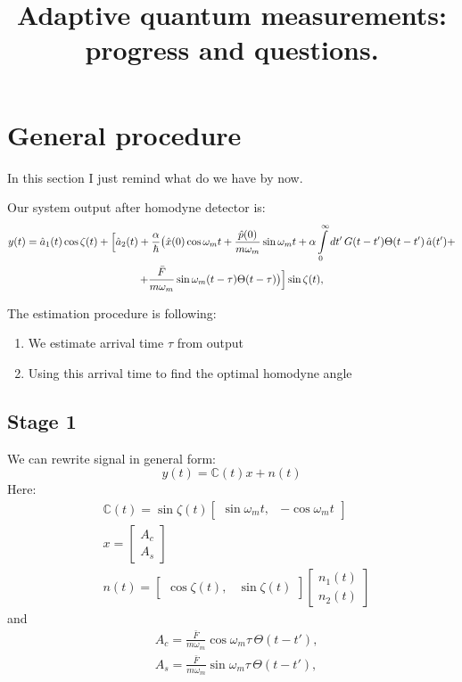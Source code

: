 \documentclass[notitlepage,a4paper,11pt,hyperref=pdftex]{revtex4-1}
\begin{document}
\title{Adaptive quantum measurements: progress and questions.}
\maketitle
\section{General procedure}
In this section I just remind what do we have by now.

Our system output  after homodyne detector is: 
\begin{multline}\label{init_y}
 y(t)=\hat{a}_1(t)\cos \zeta(t)+\Bigl[\hat{a}_2(t)+\frac{\alpha}{\hbar}\bigl(\hat{x}(0) \cos \omega_m t+ \frac{\hat{p}(0)}{m \omega_m} \sin \omega_m t + \alpha \int\limits_0^{\infty} dt' \, G(t-t') \Theta(t-t')\, \hat{a}(t') +\\+ \frac{\bar{F}}{m\omega_m}\sin\omega_m(t-\tau)\Theta(t-\tau)\bigr)\Bigr]\sin\zeta(t),
\end{multline}

The estimation procedure is following:
\begin{enumerate}
 \item We estimate arrival time $\tau$ from output
 \item Using this arrival time to find the optimal homodyne angle
\end{enumerate}

\subsection{Stage 1}
We can rewrite signal in general form:
\begin{equation}
 y(t)=\mathbb{C}(t)x+n(t)
\end{equation}
Here:
\begin{align}
& \mathbb{C}(t) = \sin\zeta(t)
\begin{bmatrix}
 \sin\omega_mt, & -\cos\omega_mt
\end{bmatrix}
\\
&
x=
\begin{bmatrix}
 A_c\\
A_s
\end{bmatrix}
\\
& n(t) = 
\begin{bmatrix}
 \cos\zeta(t), & \sin\zeta(t)
\end{bmatrix}
\begin{bmatrix}
 n_1(t)\\
n_2(t)
\end{bmatrix}
\end{align}
and 
\begin{align}
 & A_c = \frac{\bar{F}}{m\omega_m}\cos\omega_m\tau\,\Theta(t-t'),\\
& A_s = \frac{\bar{F}}{m\omega_m}\sin\omega_m\tau\,\Theta(t-t'),
\end{align}
\end{document}
